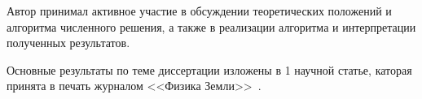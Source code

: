 {\contribution} Автор принимал активное участие в обсуждении теоретических положений и алгоритма численного решения, а также в реализации алгоритма и интерпретации полученных результатов.

{\publications} Основные результаты по теме диссертации изложены в 1 научной статье,
каторая принята в печать журналом <<Физика Земли>>~\cite{fizzemli2020}.


